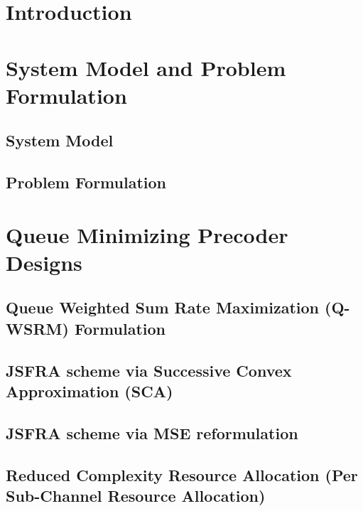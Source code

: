 \documentclass[10pt,letterpaper,journal,onecolumn]{./../Styles/IEEEtran}
\begin{document}
\begin{abstract}
%
\end{abstract}

\section{Introduction} \label{sec-1}
%

\section{System Model and Problem Formulation} 
\subsection{System Model} \label{sec-2}

\subsection{Problem Formulation} \label{sec-3.2}


\section{Queue Minimizing Precoder Designs} \label{sec-3}


\subsection{Queue Weighted Sum Rate Maximization (\acs{Q-WSRM}) Formulation} \label{sec-3.1}


\subsection{\ac{JSFRA} scheme via Successive Convex Approximation (\acs{SCA})}


\subsection{\ac{JSFRA} scheme via MSE reformulation} \label{sec-3.3}


\subsection{Reduced Complexity Resource Allocation (Per Sub-Channel Resource Allocation)} \label{sec-3.4}

\end{document}
